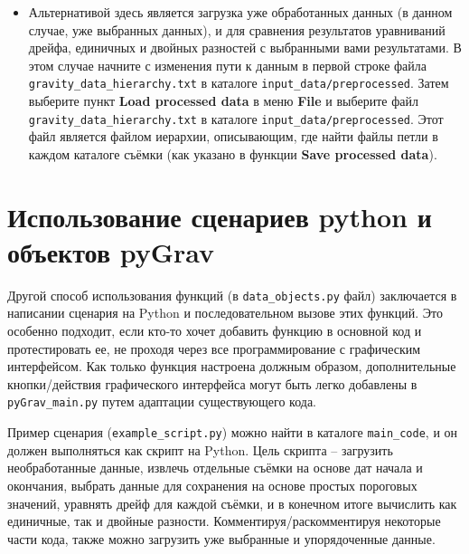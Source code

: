 \begin{itemize}
    \item Альтернативой здесь является загрузка уже обработанных данных (в
    данном случае, уже выбранных данных), и для сравнения результатов
    уравниваний дрейфа, единичных и двойных разностей с выбранными вами
    результатами. В этом случае начните с изменения пути к данным в первой
    строке файла \verb|gravity_data_hierarchy.txt| в каталоге
    \verb|input_data/preprocessed|. Затем выберите пункт \textbf{Load processed
    data} в меню \textbf{File} и выберите файл \verb|gravity_data_hierarchy.txt| в
    каталоге \verb|input_data/preprocessed|. Этот файл является файлом иерархии,
    описывающим, где найти файлы петли в каждом каталоге съёмки (как указано в
    функции \textbf{Save processed data}).
    
\end{itemize}

\section[Использование сценариев python и объектов pyGrav]{Использование сценариев python и объектов pyGrav}
\label{sec:using_a_python_script_and_pygrav_objects}

Другой способ использования функций \pg{} (в \verb|data_objects.py| файл)
заключается в написании сценария на Python и последовательном вызове этих
функций. Это особенно подходит, если кто-то хочет добавить функцию в основной
код и протестировать ее, не проходя через все программирование с графическим
интерфейсом. Как только функция настроена должным образом, дополнительные
кнопки/действия графического интерфейса могут быть легко добавлены в
\verb|pyGrav_main.py| путем адаптации существующего кода.

Пример сценария (\verb|example_script.py|) можно найти в каталоге
\verb|main_code|, и он должен выполняться как скрипт на Python. Цель скрипта --
загрузить необработанные данные, извлечь отдельные съёмки на основе дат начала и
окончания, выбрать данные для сохранения на основе простых пороговых значений,
уравнять дрейф для каждой съёмки, и в конечном итоге вычислить как единичные,
так и двойные разности. Комментируя/раскомментируя некоторые части кода, также
можно загрузить уже выбранные и упорядоченные данные.